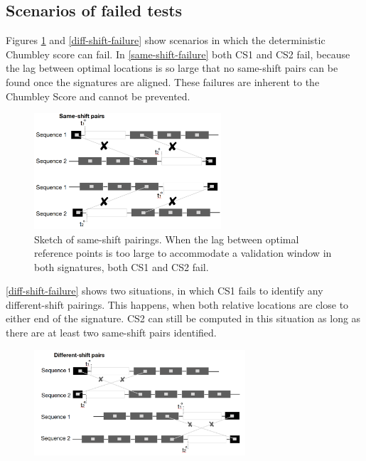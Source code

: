 \documentclass[12pt]{article}
\begin{document}
\begin{appendix}

\subsection{Scenarios of failed tests}
\label{appendix:appxfailed}
Figures \ref{same-shift-failure} and \ref{diff-shift-failure} show scenarios in which the deterministic Chumbley score can fail. 
In \autoref{same-shift-failure} both CS1 and CS2 fail, because the lag between optimal locations is so large that no same-shift pairs can be found once the signatures are aligned. These failures are inherent to the Chumbley Score and cannot be prevented.
\begin{figure}[hbtp]
\centering
\includegraphics[width=0.62\textwidth]{images/same-shift-failure.png}

\caption{\label{same-shift-failure}Sketch of same-shift pairings. When the lag between optimal reference points is too large to accommodate a validation window in both signatures, both CS1 and CS2 fail.}
\end{figure}

\autoref{diff-shift-failure} shows two situations, in which CS1 fails to identify any different-shift pairings. This happens, when both relative locations are close to either end of the signature. CS2 can still be computed in this situation as long as there are at least two same-shift pairs identified. 

\begin{figure}[hbtp]
\centering
\includegraphics[width=0.7\textwidth]{images/diff-shift-failure.png}


\end{figure}
\end{appendix}
\end{document}
